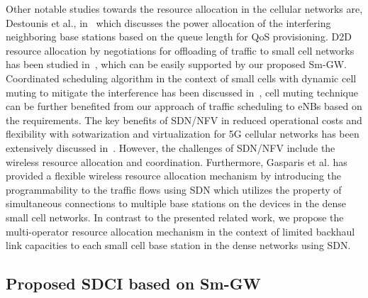 \documentclass[journal,twoside,comsoc]{IEEEtran}
\begin{document}
Other notable studies towards the resource allocation in the cellular networks are, 
Destounis et al., in~\cite{des2014queue} which discusses
the power allocation of the interfering neighboring base stations 
based on the queue length for QoS provisioning.
D2D resource allocation by negotiations for offloading of traffic to
small cell networks has been studied in~\cite{sem2015con}, which 
can be easily supported by our proposed Sm-GW.
Coordinated scheduling algorithm  in the context of small cells
with dynamic cell muting to mitigate the interference has been discussed in~\cite{wan2015dyn}, 
cell muting technique can be further benefited from
our approach of traffic scheduling to eNBs based on the requirements.
The key benefits of SDN/NFV in reduced operational costs and flexibility with
sotwarization and virtualization for 5G cellular networks has been extensively 
discussed in~\cite{aky2015wir,ros2015ben}. However, the challenges of SDN/NFV include the
wireless resource allocation and coordination. Furthermore, Gasparis et al. \cite{gas2015pro}
has provided a flexible wireless resource allocation mechanism
by introducing the programmability to the traffic flows
using SDN which utilizes the property of
simultaneous connections to multiple
base stations on the devices in the dense small cell networks. 
In contrast to the presented related work, 
we propose the multi-operator resource allocation mechanism 
in the context of limited backhaul link capacities 
to each small cell base station in the dense networks using SDN.

\subsection{Proposed SDCI based on Sm-GW}

\end{document}
